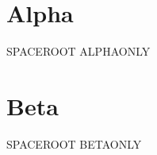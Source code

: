 \documentclass{article}
\newcommand{\RootMacro}{SPACEROOT}
\begin{document}
\section{Alpha}
\RootMacro
ALPHAONLY
\section{Beta}
\RootMacro
BETAONLY
\end{document}

